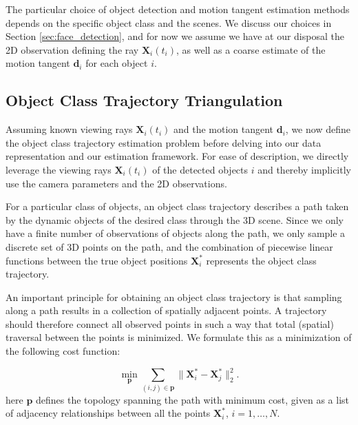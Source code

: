 The particular choice of object detection and motion tangent estimation methods depends on the specific object class and the scenes. We discuss our choices in Section \ref{sec:face_detection}, and for now we assume we have at our disposal the 2D observation  defining the ray $\mathbf{X}_i(t_i)$, as well as a coarse estimate of the motion tangent $\mathbf{d}_{i}$ for each object $i$.

\subsection{Object Class Trajectory Triangulation}
\label{sec:problem}
Assuming known viewing rays $\mathbf{X}_i(t_i)$ and the motion tangent $\mathbf{d}_{i}$, we now define the object class trajectory estimation problem before delving into our data representation and our estimation framework. For ease of description, we directly leverage the viewing rays $\mathbf{X}_i(t_i)$ of the detected objects $i$ and thereby implicitly use the camera parameters and the 2D observations.

For a particular class of objects, an object class trajectory describes a path taken by the dynamic objects of the desired class through the 3D scene. Since we only have a finite number of observations of objects along the path, we only sample a discrete set of 3D points on the path,
and the combination of piecewise linear functions between the true object positions $\mathbf{{X}}_i^*$  represents the object class trajectory.

An important principle for obtaining an object class trajectory is that sampling along a path results in a collection of spatially adjacent points. A trajectory should therefore connect all observed points in such a way that total (spatial) traversal between the points is minimized. We formulate this as a minimization of the following cost function:

\begin{equation}
\label{eq:pathsimple}
\underset{\mathbf{p}} { \min  }\sum_{(i,j)\in\mathbf{p}}{\|\mathbf{X}^*_i-\mathbf{{X}}_j^*\|_2^2}.
\end{equation}
here $\mathbf{p}$ defines the topology spanning the path with minimum cost, given as a list of adjacency relationships between all the points $\mathbf{X}_i^*$, $i=1, \dots, N$. 

